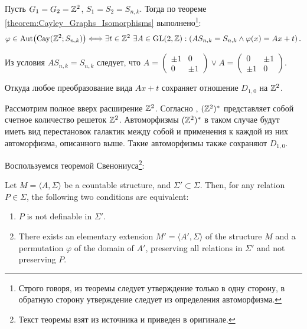 Пусть $G_1 = G_2 = \mathbb{Z}^2$, $S_1 = S_2 = S_{n,k}$. Тогда по теореме \ref{theorem:Cayley_Graphs_Isomorphisms} выполнено\footnote{Строго говоря, из теоремы следует утверждение только в одну сторону, в обратную сторону утверждение следует из определения автоморфизма.}:
$$\varphi\in\operatorname{Aut}\bigl(\operatorname{Cay}(\mathbb{Z}^2;S_{n,k})\bigr)
  \Longleftrightarrow
  \exists t\in\mathbb Z^2\
  \exists A\in\operatorname{GL}(2,\mathbb Z):
  \left(AS_{n,k}=S_{n,k} \land \varphi(x)=Ax+t\right).$$

Из условия $AS_{n,k}=S_{n,k}$ следует, что $A =
\begin{pmatrix}
  \pm 1 & 0\\
  0 & \pm 1
\end{pmatrix} 
\vee 
A = \begin{pmatrix}
  0 & \pm 1\\
  \pm 1 & 0
\end{pmatrix}.$

Откуда любое преобразование вида $Ax + t$ сохраняет отношение $D_{1, 0}$ на $\mathbb{Z}^2$.

Рассмотрим полное вверх расширение $\mathbb{Z}^2$. Согласно \cite{Upward_Complete_Structures_Semenov_Soprunov}, $(\mathbb{Z}^2)^*$ представляет собой счетное количество решеток $\mathbb{Z}^2$. 
Автоморфизмы $(\mathbb{Z}^2)^*$ в таком случае будут иметь вид перестановок галактик между собой и применения к каждой из них автоморфизма, описанного выше. Такие автоморфизмы также сохраняют $D_{1, 0}$.

Воспользуемся теоремой Свенониуса\footnote{Текст теоремы взят из источника \cite{Svenonius_Theorem_Model_Theory_Hodges} и приведен в оригинале.}:

\begin{namedTheorem}
    Let $M=\langle A,\Sigma\rangle$ be a countable structure, and $\Sigma' \subset \Sigma$. Then, for any relation $P \in \Sigma$, the following two conditions are equivalent:
    \begin{enumerate}
        \item $P$ is not definable in $\Sigma'$.
        \item There exists an elementary extension $M' = \langle A', \Sigma \rangle$ of the structure $M$ and a permutation $\varphi$ of the domain of $A'$, preserving all relations in $\Sigma'$ and not preserving $P$.
    \end{enumerate}
\end{namedTheorem}

